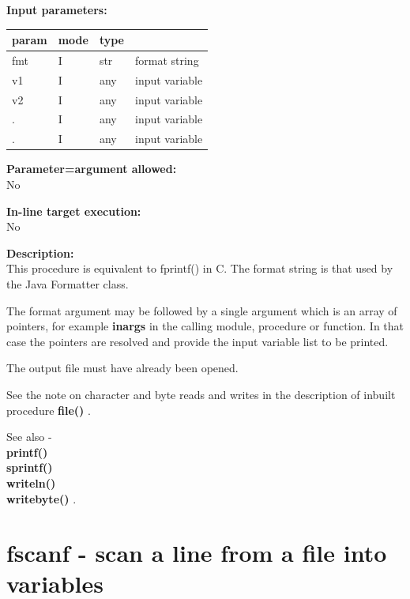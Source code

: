         {\bf Input parameters:} \\
        \begin{tabular}{| l | l | l | l |}
        \hline
        param  & mode     & type  & \\
        \hline \hline
        fmt  & I & str  & format string   \\ \hline
        v1   & I & any  & input variable  \\ \hline
        v2   & I & any  & input variable  \\ \hline
        .    & I & any  & input variable  \\ \hline
        .    & I & any  & input variable  \\ \hline
        \end{tabular}
        
        {\bf Parameter=argument allowed:} \\
        No
        
        {\bf In-line target execution:} \\
        No
        
        {\bf Description:} \\
        This procedure is equivalent to fprintf() in C. The format string is that used
        by the Java Formatter class.        
        
        The format argument may be followed by a single argument which is an array of
        pointers, for example {\bf inargs} in the calling module, procedure or function.
        In that case the pointers are resolved and provide the input variable list to be
        printed.
        
        The output file must have already been opened.
        
        See the note on character and byte reads and writes in the description
        of inbuilt procedure {\bf file()} .
        
        See also - \\
        {\bf printf()}  \\
        {\bf sprintf()}  \\
        {\bf writeln()}  \\
        {\bf writebyte()} .



    \section{fscanf - scan a line from a file into variables}\label{sec:ipfscanf}

